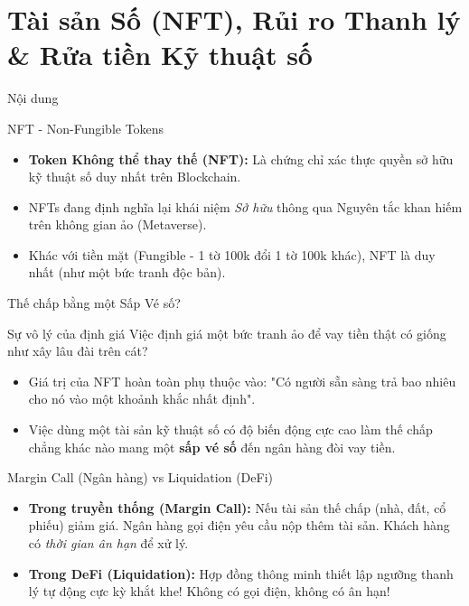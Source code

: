 \documentclass[aspectratio=169, 12pt]{beamer}
\begin{document}
\section{Tài sản Số (NFT), Rủi ro Thanh lý \& Rửa tiền Kỹ thuật số}

\begin{frame}{Nội dung}
    \tableofcontents[currentsection]
\end{frame}

\begin{frame}{NFT - Non-Fungible Tokens}
    \begin{itemize}
        \item \textbf{Token Không thể thay thế (NFT):} Là chứng chỉ xác thực quyền sở hữu kỹ thuật số duy nhất trên Blockchain.
        \item NFTs đang định nghĩa lại khái niệm \textit{Sở hữu} thông qua Nguyên tắc khan hiếm trên không gian ảo (Metaverse).
        \item Khác với tiền mặt (Fungible - 1 tờ 100k đổi 1 tờ 100k khác), NFT là duy nhất (như một bức tranh độc bản).
    \end{itemize}
\end{frame}

\begin{frame}{Thế chấp bằng một Sấp Vé số?}
    \begin{block}{Sự vô lý của định giá}
        Việc định giá một bức tranh ảo để vay tiền thật có giống như xây lâu đài trên cát?
    \end{block}
    \begin{itemize}
        \item Giá trị của NFT hoàn toàn phụ thuộc vào: "Có người sẵn sàng trả bao nhiêu cho nó vào một khoảnh khắc nhất định".
        \item Việc dùng một tài sản kỹ thuật số có độ biến động cực cao làm thế chấp chẳng khác nào mang một \textbf{sấp vé số} đến ngân hàng đòi vay tiền.
    \end{itemize}
\end{frame}

\begin{frame}{Margin Call (Ngân hàng) vs Liquidation (DeFi)}
    \begin{itemize}
        \item \textbf{Trong truyền thống (Margin Call):} Nếu tài sản thế chấp (nhà, đất, cổ phiếu) giảm giá. Ngân hàng gọi điện yêu cầu nộp thêm tài sản. Khách hàng có \textit{thời gian ân hạn} để xử lý.
        \item \textbf{Trong DeFi (Liquidation):} Hợp đồng thông minh thiết lập ngưỡng thanh lý tự động cực kỳ khắt khe! Không có gọi điện, không có ân hạn!
    \end{itemize}
\end{frame}
\end{document}
